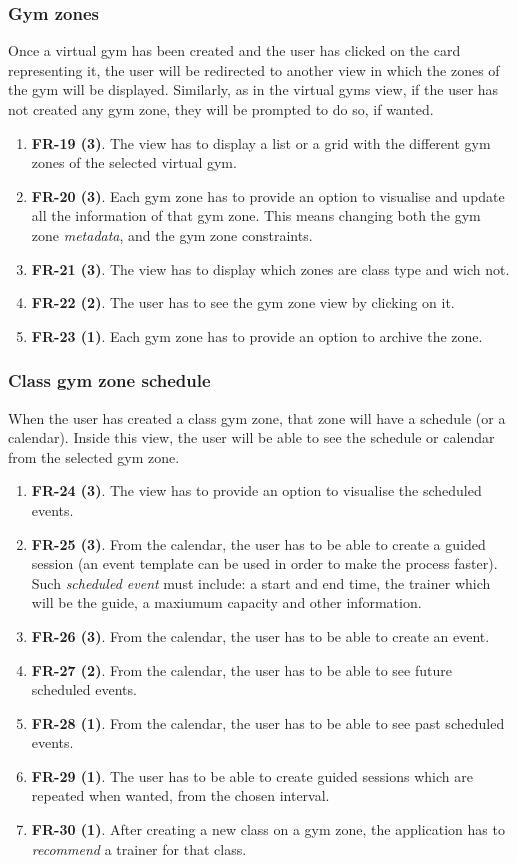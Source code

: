 \documentclass[a4paper, 12pt, oneside]{book}
\begin{document}
\subsubsection{Gym zones}
Once a virtual gym has been created and the user has clicked on the card representing it, the user will be redirected to another view in which the zones of the gym will be displayed. Similarly, as in the virtual gyms view, if the user has not created any gym zone, they will be prompted to do so, if wanted.
\begin{enumerate}[label = -]
	\item \textbf{FR-19 (3)}. The view has to display a list or a grid with the different gym zones of the selected virtual gym.
	\item \textbf{FR-20 (3)}. Each gym zone has to provide an option to visualise and update all the information of that gym zone. This means changing both the gym zone \emph{metadata}, and the gym zone constraints.
	\item \textbf{FR-21 (3)}. The view has to display which zones are class type and wich not.
	\item \textbf{FR-22 (2)}. The user has to see the gym zone view by clicking on it.
	\item \textbf{FR-23 (1)}. Each gym zone has to provide an option to archive the zone.
\end{enumerate}
\subsubsection{Class gym zone schedule}
When the user has created a class gym zone, that zone will have a schedule (or a calendar). Inside this view, the user will be able to see the schedule or calendar from the selected gym zone.
\begin{enumerate}[label = -]
	\item \textbf{FR-24 (3)}. The view has to provide an option to visualise the scheduled events.
	\item \textbf{FR-25 (3)}. From the calendar, the user has to be able to create a guided session (an event template can be used in order to make the process faster). Such \emph{scheduled event} must include: a start and end time, the trainer which will be the guide, a maxiumum capacity and other information.
	\item \textbf{FR-26 (3)}. From the calendar, the user has to be able to create an event.
	\item \textbf{FR-27 (2)}. From the calendar, the user has to be able to see future scheduled events.
	\item \textbf{FR-28 (1)}. From the calendar, the user has to be able to see past scheduled events.
	\item \textbf{FR-29 (1)}. The user has to be able to create guided sessions which are repeated when wanted, from the chosen interval.
	\item \textbf{FR-30 (1)}. After creating a new class on a gym zone, the application has to \emph{recommend} a trainer for that class.
\end{enumerate}
\end{document}
